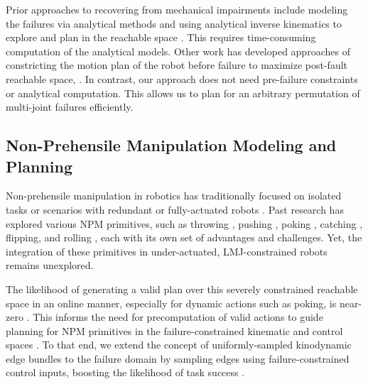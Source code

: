 Prior approaches to recovering from mechanical impairments include modeling the failures via analytical methods \cite{du2017fault, shome2021asymptotically} and using analytical inverse kinematics to explore and plan in the reachable space \cite{mu2016kinematic}. This requires time-consuming computation of the analytical models. Other work has developed approaches of constricting the motion plan of the robot before failure to maximize post-fault reachable space, \cite{xie2021maximizing, lewis1997fault}. 
In contrast, our approach does not need pre-failure constraints or analytical computation. This allows us to plan for an arbitrary permutation of multi-joint failures efficiently.

\subsection{Non-Prehensile Manipulation Modeling and Planning}

Non-prehensile manipulation in robotics has traditionally focused on isolated tasks or scenarios with redundant or fully-actuated robots \cite{ruggiero2018nonprehensile,mason2018toward}.
Past research has explored various NPM primitives, such as throwing \cite{zeng2020tossingbot}, pushing \cite{stuber2020let}, poking \cite{pasricha2022pokerrt}, catching \cite{kim2014catching}, flipping, and rolling \cite{lynch1999dynamic, ruggiero2018nonprehensile}, each with its own set of advantages and challenges. Yet, the integration of these primitives in under-actuated, LMJ-constrained robots remains unexplored.

The likelihood of generating a valid plan over this severely constrained reachable space in an online manner, especially for dynamic actions such as poking, is near-zero \cite{kingston2018sampling}. This informs the need for precomputation of valid actions to guide planning for NPM primitives in the failure-constrained kinematic and control spaces \cite{westbrook2020anytime,chamzas2019using,shome2021asymptotically}.
To that end, we extend the concept of uniformly-sampled kinodynamic edge bundles \cite{shome2021asymptotically} to the failure domain by sampling edges using failure-constrained control inputs, boosting the likelihood of task success \cite{li2015sparse, kingston2018sampling}.

